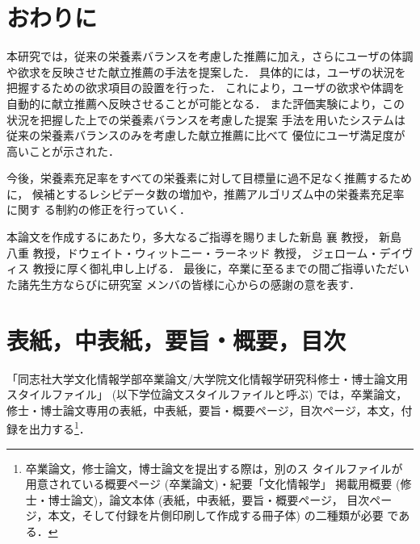 \documentclass[11pt,titlepage,uplatex]{ujreport}
\renewcommand{\bibname}{参考文献}
\begin{document}
\chapter{おわりに}
本研究では，従来の栄養素バランスを考慮した推薦に加え，さらにユーザの体調
や欲求を反映させた献立推薦の手法を提案した．
具体的には，ユーザの状況を把握するための欲求項目の設置を行った．
これにより，ユーザの欲求や体調を自動的に献立推薦へ反映させることが可能となる．
また評価実験により，この状況を把握した上での栄養素バランスを考慮した提案
手法を用いたシステムは従来の栄養素バランスのみを考慮した献立推薦に比べて
優位にユーザ満足度が高いことが示された．

今後，栄養素充足率をすべての栄養素に対して目標量に過不足なく推薦するために，
候補とするレシピデータ数の増加や，推薦アルゴリズム中の栄養素充足率に関す
る制約の修正を行っていく．

\acknowledgements
{}

本論文を作成するにあたり，多大なるご指導を賜りました新島 襄 教授，
新島 八重 教授，ドウェイト・ウィットニー・ラーネッド 教授，
ジェローム・デイヴィス 教授に厚く御礼申し上げる．
最後に，卒業に至るまでの間ご指導いただいた諸先生方ならびに研究室
メンバの皆様に心からの感謝の意を表す．
\newpage

\makeatletter
\renewenvironment{thebibliography}[1]
{\chapter*{\bibname\@mkboth{\bibname}{\bibname}}%
 \addcontentsline{toc}{chapter}{\bibname}%
   \list{\@biblabel{\@arabic\c@enumiv}}%
        {\settowidth\labelwidth{\@biblabel{#1}}%
         \leftmargin\labelwidth
         \advance\leftmargin\labelsep
         \@openbib@code
         \usecounter{enumiv}%
         \let\p@enumiv\@empty
         \renewcommand\theenumiv{\@arabic\c@enumiv}}%
   \sloppy
   \clubpenalty4000
   \@clubpenalty\clubpenalty
   \widowpenalty4000%
   \sfcode`\.\@m}
  {\def\@noitemerr
    {\@latex@warning{Empty `thebibliography' environment}}%
   \endlist}
\makeatother



\appendix
\chapter{表紙，中表紙，要旨・概要，目次}
\setcounter{page}{1}
\renewcommand{\thepage}{\thechapter-\arabic{page}}
「同志社大学文化情報学部卒業論文/大学院文化情報学研究科修士・博士論文用
スタイルファイル」 (以下学位論文スタイルファイルと呼ぶ) では，卒業論文，
修士・博士論文専用の表紙，中表紙，要旨・概要ページ，目次ページ，本文，付
録を出力する\footnote{卒業論文，修士論文，博士論文を提出する際は，別のス
タイルファイルが用意されている概要ページ (卒業論文)・紀要「文化情報学」
掲載用概要 (修士・博士論文)，論文本体 (表紙，中表紙，要旨・概要ページ，
目次ページ，本文，そして付録を片側印刷して作成する冊子体) の二種類が必要
である．}．
\end{document}
